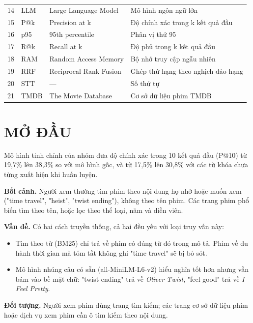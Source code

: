 \documentclass[12pt,a4paper]{article}
\providecommand{\tightlist}{\setlength{\itemsep}{0pt}\setlength{\parskip}{0pt}}
\begin{document}
{\begin{longtable}[]{@{}P{(\linewidth - 6\tabcolsep) * }P{(\linewidth - 6\tabcolsep) * }P{(\linewidth - 6\tabcolsep) * }P{(\linewidth - 6\tabcolsep) * }@{}}
14 & LLM & Large Language Model & Mô hình ngôn ngữ lớn \\
15 & P@k & Precision at k & Độ chính xác trong k kết quả đầu \\
16 & p95 & 95th percentile & Phân vị thứ 95 \\
17 & R@k & Recall at k & Độ phủ trong k kết quả đầu \\
18 & RAM & Random Access Memory & Bộ nhớ truy cập ngẫu nhiên \\
19 & RRF & Reciprocal Rank Fusion & Ghép thứ hạng theo nghịch đảo hạng \\
20 & STT & --- & Số thứ tự \\
21 & TMDB & The Movie Database & Cơ sở dữ liệu phim TMDB \\
\end{longtable}
}

\clearpage
{}
\setcounter{page}{1}
\section{MỞ ĐẦU}

Mô hình tinh chỉnh của nhóm đưa độ chính xác trong 10 kết quả đầu (P@10) từ 19,7\% lên 38,3\% so với mô hình gốc, và từ 17,5\% lên 30,8\% với các từ khóa chưa từng xuất hiện khi huấn luyện.

\textbf{Bối cảnh.} Người xem thường tìm phim theo nội dung họ nhớ hoặc muốn xem ("time travel", "heist", "twist ending"), không theo tên phim. Các trang phim phổ biến tìm theo tên, hoặc lọc theo thể loại, năm và diễn viên.

\textbf{Vấn đề.} Có hai cách truyền thống, cả hai đều yếu với loại truy vấn này:

\begin{itemize}
\tightlist
\item Tìm theo từ (BM25) chỉ trả về phim có đúng từ đó trong mô tả. Phim về du hành thời gian mà tóm tắt không ghi "time travel" sẽ bị bỏ sót.
\item Mô hình nhúng câu có sẵn (all-MiniLM-L6-v2) hiểu nghĩa tốt hơn nhưng vẫn bám vào bề mặt chữ: "twist ending" trả về \emph{Oliver Twist}, "feel-good" trả về \emph{I Feel Pretty}.
\end{itemize}

\textbf{Đối tượng.} Người xem phim dùng trang tìm kiếm; các trang cơ sở dữ liệu phim hoặc dịch vụ xem phim cần ô tìm kiếm theo nội dung.
\end{document}
